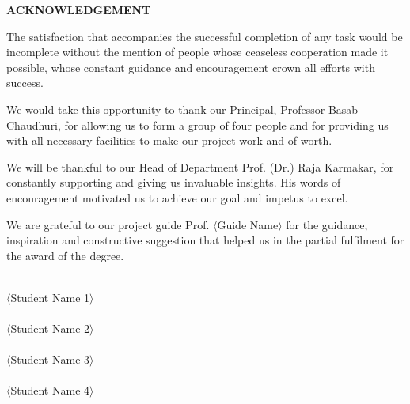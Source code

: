 \newpage
\thispagestyle{empty}
\begin{center}
{\LARGE\bfseries ACKNOWLEDGEMENT\\[1cm]}
\end{center}

The satisfaction that accompanies the successful completion of any task would be incomplete without the mention of people whose ceaseless cooperation made it possible, whose constant guidance and encouragement crown all efforts with success.

\vspace{0.5cm}
We would take this opportunity to thank our Principal, Professor Basab Chaudhuri, for allowing us to form a group of four people and for providing us with all necessary facilities to make our project work and of worth.

\vspace{0.5cm}
We will be thankful to our Head of Department Prof. (Dr.) Raja Karmakar, for constantly supporting and giving us invaluable insights. His words of encouragement motivated us to achieve our goal and impetus to excel.

\vspace{0.5cm}
We are grateful to our project guide Prof. $\langle$Guide Name$\rangle$ for the guidance, inspiration and constructive suggestion that helped us in the partial fulfilment for the award of the degree.

\vspace{3cm}
\begin{flushright}
\dotfill\\$\langle$Student Name 1$\rangle$\\[1cm]
\dotfill\\$\langle$Student Name 2$\rangle$\\[1cm]
\dotfill\\$\langle$Student Name 3$\rangle$\\[1cm]
\dotfill\\$\langle$Student Name 4$\rangle$
\end{flushright}
